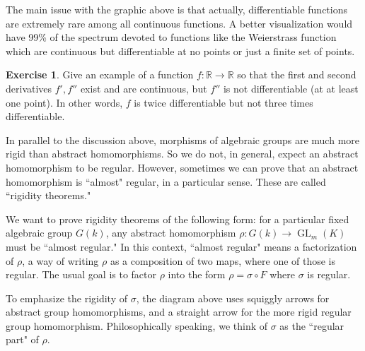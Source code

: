 \documentclass[12pt]{article}
\theoremstyle{definition}
\newtheorem{exercise}[theorem]{Exercise}
\numberwithin{theorem}{subsection}
\newcommand{\R}{\mathbb{R}}
\newcommand{\sig}{\sigma}
\DeclareMathOperator{\GL}{GL}
\begin{document}
\begin{center}
\end{center}
The main issue with the graphic above is that actually, differentiable functions are extremely rare among all continuous functions. A better visualization would have 99\% of the spectrum devoted to functions like the Weierstrass function which are continuous but differentiable at no points or just a finite set of points.

\begin{exercise}
Give an example of a function $f:\R \to \R$ so that the first and second derivatives $f', f''$ exist and are continuous, but $f''$ is not differentiable (at at least one point). In other words, $f$ is twice differentiable but not three times differentiable.
\end{exercise}

In parallel to the discussion above, morphisms of algebraic groups are much more rigid than abstract homomorphisms. So we do not, in general, expect an abstract homomorphism to be regular. However, sometimes we can prove that an abstract homomorphism is ``almost" regular, in a particular sense. These are called ``rigidity theorems."

We want to prove rigidity theorems of the following form: for a particular fixed algebraic group $G(k)$, any abstract homomorphism $\rho:G(k) \to \GL_m(K)$ must be ``almost regular." In this context, ``almost regular" means a factorization of $\rho$, a way of writing $\rho$ as a composition of two maps, where one of those is regular. The usual goal is to factor $\rho$ into the form $\rho = \sig \circ F$ where $\sig$ is regular.
\begin{center}
\end{center}
To emphasize the rigidity of $\sig$, the diagram above uses squiggly arrows for abstract group homomorphisms, and a straight arrow for the more rigid regular group homomorphism. Philosophically speaking, we think of $\sig$ as the ``regular part" of $\rho$.
\end{document}
